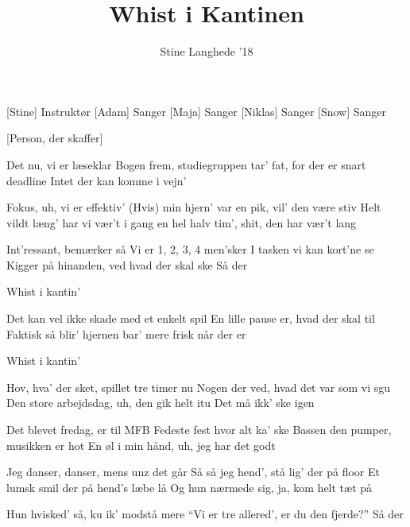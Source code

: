 \documentclass[a4paper,11pt]{article}
\title{Whist i Kantinen}
\author{Stine Langhede '18}
\begin{document}
\maketitle

\begin{roles}
[Stine] Instruktør
[Adam] Sanger
[Maja] Sanger
[Niklas] Sanger
[Snow] Sanger
\end{roles}

\begin{props}
[Person, der skaffer]
\end{props}


\begin{song}

%
Det nu, vi er læseklar
Bogen frem, studiegruppen tar’
fat, for der er snart deadline 
Intet der kan komme i vejn’

%
Fokus, uh, vi er effektiv’
(Hvis) min hjern’ var en pik, vil’ den være stiv
Helt vildt læng' har vi vær’t i gang
en hel halv tim’, shit, den har vær’t lang


%
Int’ressant, bemærker så
Vi er 1, 2, 3, 4 men’sker 
I tasken vi kan kort’ne se
Kigger på hinanden, ved hvad der skal ske
Så der


%
Whist i kantin’

%
Det kan vel ikke skade med et enkelt spil
En lille pause er, hvad der skal til
Faktisk så blir’ hjernen bar’ mere frisk
når der er

%
Whist i kantin’

%
Hov, hva’ der sket, spillet tre timer nu
Nogen der ved, hvad det var som vi sgu
Den store arbejdsdag, uh, den gik helt itu
Det må ikk’ ske igen 


%
Det blevet fredag, er til MFB
Fedeste fest hvor alt ka’ ske
Bassen den pumper, musikken er hot
En øl i min hånd, uh, jeg har det godt


%
Jeg danser, danser, mens unz det går
Så så jeg hend’, stå lig’ der på floor
Et lumsk smil der på hend’s læbe lå
Og hun nærmede sig, ja, kom helt tæt på

%
Hun hvisked' så, ku ik’ modstå mere
“Vi er tre allered’, er du den fjerde?”
Så der


\end{song}
\end{document}
